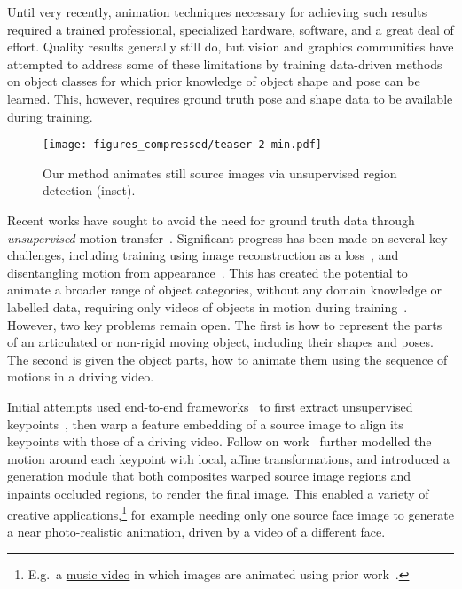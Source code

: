 \documentclass[final]{cvpr}
\begin{document}
Until very recently, animation techniques necessary for achieving such results required a trained professional, specialized hardware, software, and a great deal of effort. Quality results generally still do, but vision and graphics communities have attempted to address some of these limitations by training data-driven methods~\cite{wang2018video, chan2019everybody, ren2020human, geng20193d,gafni2019vid2game} on object classes for which prior knowledge of object shape and pose can be learned. This, however, requires ground truth pose and shape data to be available during training. 

\begin{figure}[h]
    \centering
    \texttt{[image: figures\_compressed/teaser-2-min.pdf]}
    \caption{Our method animates still source images via unsupervised region detection (inset).}
    \label{fig:teaser}
    \vspace{-0.4cm}
\end{figure}

Recent works have sought to avoid the need for ground truth data through \emph{unsupervised} motion transfer~\cite{wiles2018x2face, fomm,siarohin2018animating}. Significant progress has been made on several key challenges, including training using image reconstruction as a loss~\cite{wiles2018x2face, fomm,siarohin2018animating}, and disentangling motion from appearance~\cite{lorenz2019unsupervised}. This has created the potential to animate a broader range of object categories, without any domain knowledge or labelled data, requiring only videos of objects in motion during training~\cite{fomm}. However, two key problems remain open. The first is how to represent the parts of an articulated or non-rigid moving object, including their shapes and poses. The second is given the object parts, how to animate them using the sequence of motions in a driving video.
    
Initial attempts used  end-to-end frameworks~\cite{wiles2018x2face, siarohin2018animating} to first extract unsupervised keypoints~\cite{lorenz2019unsupervised,kim2019unsupervised}, then warp a feature embedding of a source image to align its keypoints with those of a driving video. Follow on work~\cite{fomm} further modelled the motion around each keypoint with local, affine transformations, and introduced a generation module that both composites warped source image regions and inpaints occluded regions, to render the final image. This enabled a variety of creative applications,\!\!\footnote{E.g.\ a \href{https://www.youtube.com/watch?v=Ac6kDNMQK3c}{music video} in which images are animated using prior work~\cite{fomm}.} for example needing only one source face image to generate a near photo-realistic animation, driven by a video of a different face.
\end{document}
